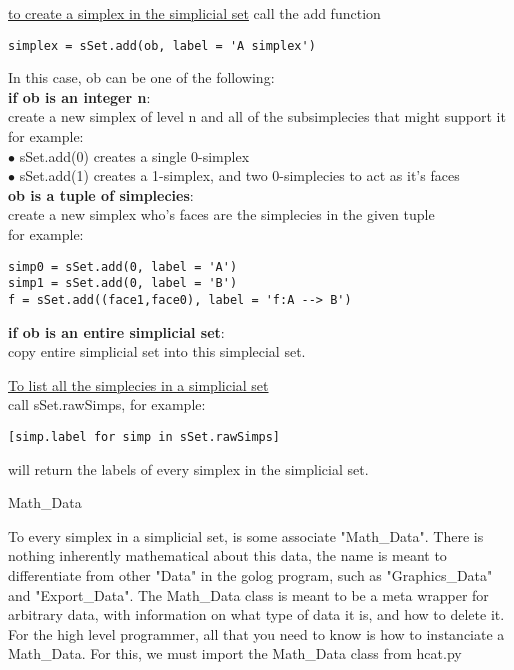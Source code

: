 \documentclass{article}
\begin{document}
\underline{to create a simplex in the simplicial set} call the add function

\begin{lstlisting}
simplex = sSet.add(ob, label = 'A simplex') 
\end{lstlisting}

In this case, ob can be one of the following:\\

\textbf{if ob is an integer n}:\\
create a new simplex of level n and all of the subsimplecies that might support it\\

for example: \\
$\bullet$ sSet.add(0) creates a single 0-simplex\\
$\bullet$ sSet.add(1) creates a 1-simplex, and two 0-simplecies to act as it's faces\\

\textbf{ob is a tuple of simplecies}:\\
create a new simplex who's faces are the simplecies in the given tuple\\

for example:

\begin{lstlisting}
simp0 = sSet.add(0, label = 'A')
simp1 = sSet.add(0, label = 'B')
f = sSet.add((face1,face0), label = 'f:A --> B')
\end{lstlisting}

\textbf{if ob is an entire simplicial set}:\\
copy entire simplicial set into this simplecial set.\\
\newpage

\underline{To list all the simplecies in a simplicial set}\\
call sSet.rawSimps, for example:

\begin{lstlisting}
[simp.label for simp in sSet.rawSimps]
\end{lstlisting}

will return the labels of every simplex in the simplicial set.

\begin{subsection}{Math\_Data}
\end{subsection}

To every simplex in a simplicial set, is some associate "Math\_Data". There is nothing inherently mathematical about this data, the name is meant to differentiate from other "Data" in the golog program, such as "Graphics\_Data" and "Export\_Data". The Math\_Data class is meant to be a meta wrapper for arbitrary data, with information on what type of data it is, and how to delete it. For the high level programmer, all that you need to know is how to instanciate a Math\_Data. For this, we must import the Math\_Data class from hcat.py
\end{document}
